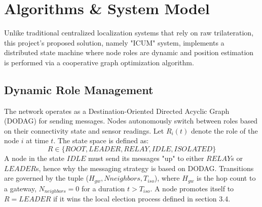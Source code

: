 \section{Algorithms \& System Model}
\noindent Unlike traditional centralized localization systems that rely on raw trilateration, this project's proposed solution, namely "ICUM" system, implements a distributed state machine where node roles are dynamic and position estimation is performed via a cooperative graph optimization algorithm.

\subsection{Dynamic Role Management}
\noindent The network operates as a Destination-Oriented Directed Acyclic Graph (DODAG) for sending messages. Nodes autonomously switch between roles based on their connectivity state and sensor readings. Let $R_i(t)$ denote the role of the node $i$ at time $t$. The state space is defined as: 
\begin{equation}
    R \in \{ROOT, LEADER, RELAY, IDLE, ISOLATED\}
\end{equation}
A node in the state $IDLE$ must send its messages "up" to either $RELAY$s or $LEADER$s, hence why the messaging strategy is based on DODAG. Transitions are governed by the tuple ($H_{gw}, N{neighbors},T_{iso}$), where $H_{gw}$ is the hop count to a gateway, $N_{neighbors} = 0$ for a duration $t > T_{iso}$. A node promotes itself to $R = LEADER$ if it wins the local election process defined in section 3.4.


